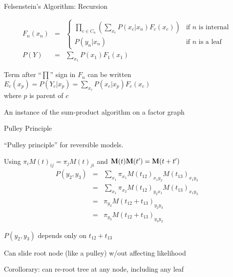 \documentclass{beamer}
\begin{document}
\begin{frame}{Felsenstein's Algorithm: Recursion}

\begin{eqnarray*}
F_n(x_n) & = & \left\{ \begin{array}{ll} \displaystyle
\prod_{\mbox{$c \in C_n$}} \left( \sum_{x_c} P(x_c|x_n) F_c(x_c) \right) & \mbox{if $n$ is internal} \\
P(y_n|x_n) & \mbox{if $n$ is a leaf}
\end{array} \right. \\
P(Y) & = & \sum_{x_1} P(x_1) F_1(x_1)
\end{eqnarray*}

\itemb
  \item Term after ``$\prod$'' sign in $F_n$ can be written $E_c(x_p) = P(Y_c|x_p) = \sum_{x_c} P(x_c|x_p) F_c(x_c)$ \\ where $p$ is parent of $c$
  \item An instance of the \alert{sum-product algorithm} on a factor graph
\iteme

\end{frame}

\begin{frame}{Pulley Principle}

\itemb
\item ``Pulley principle'' for reversible models. %
\Tree [ .1 2 3 ]
 \itemb
 \item Using $\pi_i M(t)_{ij} = \pi_j M(t)_{ji}$ and ${\bf M}(t){\bf M}(t')={\bf M}(t+t')$
\begin{eqnarray*}
P(y_2,y_3) & = & \sum_{x_1} \pi_{x_1} M(t_{12})_{x_1 y_2} M(t_{13})_{x_1 y_3} \\
& = & \sum_{x_1} \pi_{x_2} M(t_{12})_{y_2 x_1} M(t_{13})_{x_1 y_3} \\
& = & \pi_{y_2} M(t_{12}+t_{13})_{y_2 y_3} \\
& = & \pi_{y_3} M(t_{12}+t_{13})_{y_3 y_2}
\end{eqnarray*}
 \item $P(y_2,y_3)$ depends only on $t_{12}+t_{13}$
 \item Can slide root node (like a pulley) w/out affecting likelihood 
 \item Corollorary: can re-root tree at any node, including any leaf
 \iteme
\iteme

\end{frame}
\end{document}
